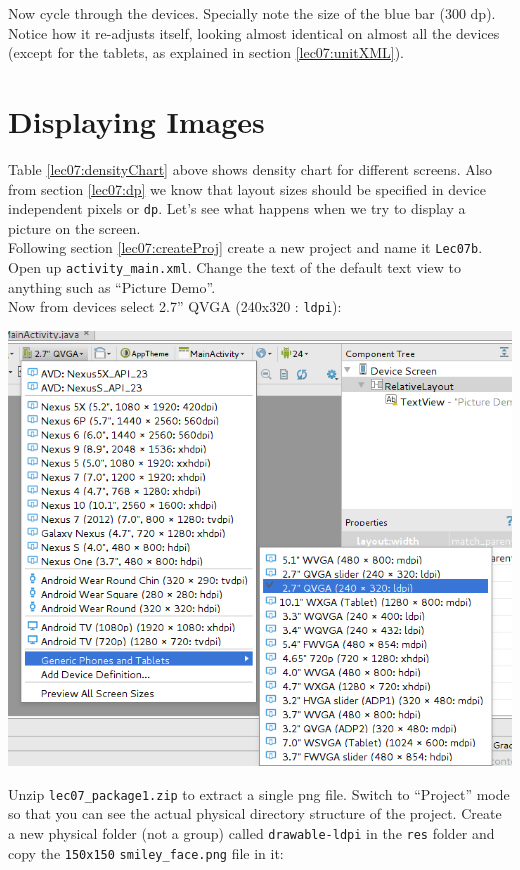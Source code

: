 Now cycle through the devices. Specially note the size of the blue bar (300 dp). Notice how it re-adjusts itself, looking almost identical on almost all the devices (except for the tablets, as explained in section \ref{lec07:unitXML}).

\section{Displaying Images}
\label{lec07:displayImages}
Table \ref{lec07:densityChart} above shows density chart for different screens. Also from section \ref{lec07:dp} we know that layout sizes should be specified in device independent pixels or \texttt{dp}. Let's see what happens when we try to display a picture on the screen.\\

Following section \ref{lec07:createProj} create a new project and name it \texttt{Lec07b}. Open up \texttt{activity\_main.xml}. Change the text of the default text view to anything such as ``Picture Demo''. \\

Now from devices select 2.7'' QVGA (240x320 : \texttt{ldpi}):

\begin{center}
	\includegraphics[scale=0.4]{chapters/ch06/images/7}
\end{center}

Unzip \texttt{lec07\_package1.zip} to extract a single png file. Switch to ``Project'' mode so that you can see the actual physical directory structure of the project. Create a new physical folder (not a group) called \texttt{drawable-ldpi} in the \texttt{res} folder and copy the \texttt{150x150} \texttt{smiley\_face.png} file in it:

